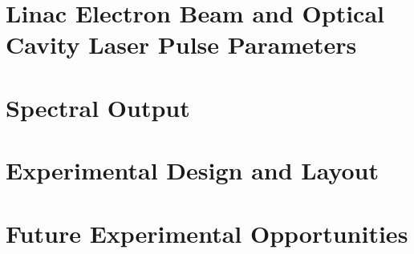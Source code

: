 \documentclass[../main.tex]{subfiles}
\begin{document}
\section{Linac Electron Beam and Optical Cavity Laser Pulse Parameters}

\section{Spectral Output}

\section{Experimental Design and Layout}

\section{Future Experimental Opportunities}
\end{document}
